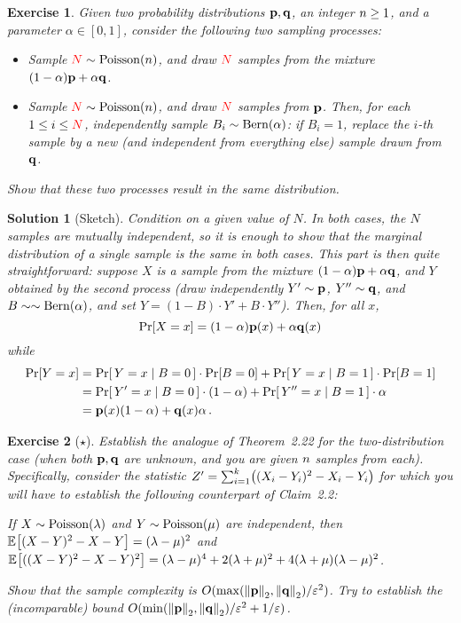 \documentclass[biber]{nowfnt} %
\newtheorem{question}{Exercise}[chapter]
\newtheorem{solution}{Solution}[chapter]
\newcommand{\occur}{\textcolor{red}{N}}
\newcommand{\occur}{N}
\begin{document}
\begin{question}\label{ex:mixture:sample}
Given two probability distributions $\mathbf{p},\mathbf{q}$, an integer $n\geq 1$, and a parameter $\alpha\in[0,1]$, consider the following two sampling processes:
\begin{itemize}
  \item Sample $\occur \sim \poisson{\ns}$, and draw $\occur$ \iid samples from the mixture $(1-\alpha)\mathbf{p}+\alpha\mathbf{q}$.
  \item Sample $\occur \sim \poisson{\ns}$, and draw $\occur$ \iid samples from $\mathbf{p}$. Then, for each $1\leq i\leq \occur$, independently sample $B_i\sim\operatorname{Bern}( \alpha ) $: if $B_i=1$, replace the $i$-th sample by a new (and independent from everything else) sample drawn from $\mathbf{q}$.
\end{itemize}
Show that these two processes result in the same distribution.
\end{question}
\begin{solution}[Sketch]
Condition on a given value of $N$. In both cases, the $N$ samples are mutually independent, so it is enough to show that the marginal distribution of a single sample is the same in both cases. This part is then quite straightforward: suppose $X$ is a sample from the mixture $(1-\alpha)\mathbf{p}+\alpha\mathbf{q}$, and $Y$ obtained by the second process (draw independently $Y'\sim\mathbf{p}$, $Y''\sim \mathbf{q}$, and $B\sim\sim\operatorname{Bern}( \alpha ) $, and set $Y=(1-B)\cdot Y'+B\cdot Y''$). Then, for all $x$,
\[
	\bPr{X=x} =  (1-\alpha)\p(x)+\alpha\q(x)
\] 
while
\begin{align*}
	\bPr{Y=x} 
	&=  \probaCond{Y=x}{B=0}\cdot \bPr{B=0} + \probaCond{Y=x}{B=1}\cdot \bPr{B=1} \\
	&= \probaCond{Y'=x}{B=0}\cdot (1-\alpha) + \probaCond{Y''=x}{B=1}\cdot \alpha \\
	&=  \p(x)(1-\alpha)+\q(x)\alpha\,.
\end{align*}
\end{solution}
\begin{question}[$\star$]\label{ex:l2:closeness}
Establish the analogue of Theorem~2.22 for the \emph{two-distribution} case (when both $\mathbf{p},\mathbf{q}$ are unknown, and you are given $n$ \iid samples from each). Specifically, consider the statistic
$Z'=\sum_{i=1}^\ab \Paren{(X_i-Y_i)^2-X_i-Y_i}$
for which you will have to establish the following counterpart of Claim~2.2:
\begin{claim}
	\label{claim:closeness:moments:poisson}
If $X\sim\poisson{\lambda}$ and $Y\sim\poisson{\mu}$ are independent, then 
  $
  \bEE{(X-Y)^2-X-Y} = (\lambda-\mu)^2
  $
  and 
  $
  \bEE{((X-Y)^2-X-Y)^2} = (\lambda-\mu)^4 + 2(\lambda+\mu)^2 + 4(\lambda+\mu)(\lambda-\mu)^2
  $.
\end{claim}
\noindent Show that the sample complexity is $O(\max\Paren{\normtwo{\p},\normtwo{\q}}/\dst^2)$. Try to establish the (incomparable) bound $O(\min\Paren{\normtwo{\p},\normtwo{\q}}/\dst^2+1/\dst)$.
\end{question}
\end{document}
